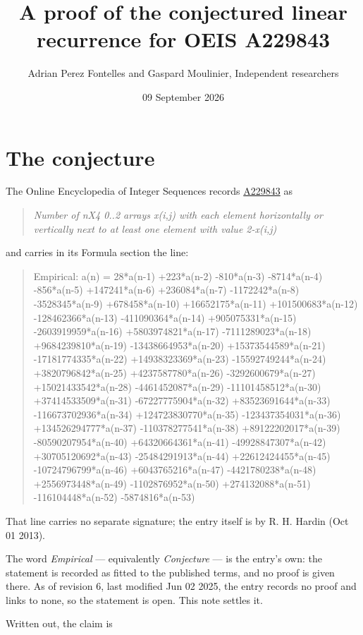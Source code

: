 \documentclass[11pt]{article}
\title{A proof of the conjectured linear recurrence for OEIS A229843}
\author{Adrian Perez Fontelles and Gaspard Moulinier, Independent researchers}
\date{09 September 2026}
\theoremstyle{definition}
\begin{document}
\maketitle
\section{The conjecture}

The Online Encyclopedia of Integer Sequences records \href{https://oeis.org/A229843}{A229843} as

\begin{quote}\itshape Number of nX4 0..2 arrays x(i,j) with each element horizontally or vertically next to at least one element with value 2-x(i,j)\end{quote}

and carries in its Formula section the line:

\begin{quote}\ttfamily Empirical: a(n) = 28*a(n-1) +223*a(n-2) -810*a(n-3) -8714*a(n-4) -856*a(n-5) +147241*a(n-6) +236084*a(n-7) -1172242*a(n-8) -3528345*a(n-9) +678458*a(n-10) +16652175*a(n-11) +101500683*a(n-12) -128462366*a(n-13) -411090364*a(n-14) +905075331*a(n-15) -2603919959*a(n-16) +5803974821*a(n-17) -7111289023*a(n-18) +9684239810*a(n-19) -13438664953*a(n-20) +15373544589*a(n-21) -17181774335*a(n-22) +14938323369*a(n-23) -15592749244*a(n-24) +3820796842*a(n-25) +4237587780*a(n-26) -3292600679*a(n-27) +15021433542*a(n-28) -4461452087*a(n-29) -11101458512*a(n-30) +37414533509*a(n-31) -67227775904*a(n-32) +83523691644*a(n-33) -116673702936*a(n-34) +124723830770*a(n-35) -123437354031*a(n-36) +134526294777*a(n-37) -110378277541*a(n-38) +89122202017*a(n-39) -80590207954*a(n-40) +64320664361*a(n-41) -49928847307*a(n-42) +30705120692*a(n-43) -25484291913*a(n-44) +22612424455*a(n-45) -10724796799*a(n-46) +6043765216*a(n-47) -4421780238*a(n-48) +2556973448*a(n-49) -1102876952*a(n-50) +274132088*a(n-51) -116104448*a(n-52) -5874816*a(n-53)\end{quote}

That line carries no separate signature; the entry itself is by R. H. Hardin (Oct 01 2013).

The word {\itshape Empirical} --- equivalently {\itshape Conjecture} --- is the entry's own: the statement is recorded as fitted to the published terms, and no proof is given there. As of revision 6, last modified Jun 02 2025, the entry records no proof and links to none, so the statement is open. This note settles it.

Written out, the claim is
\end{document}

